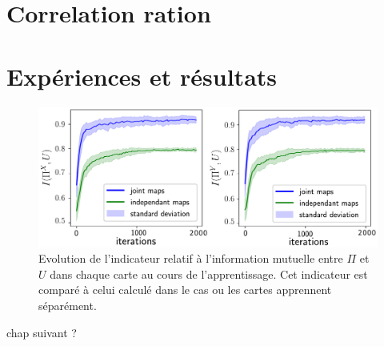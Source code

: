 \section{Correlation ration}


\section{Expériences et résultats}

\begin{figure}
\centering
\includegraphics[width=\textwidth]{mutual_info_evol.pdf}
\caption{Evolution de l'indicateur relatif à l'information mutuelle entre $\Pi$ et $U$ dans chaque carte au cours de l'apprentissage. Cet indicateur est comparé à celui calculé dans le cas ou les cartes apprennent séparément.}
\label{fig:im} 
\end{figure}


chap suivant ? 
